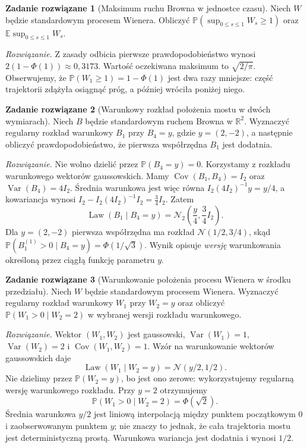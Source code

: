 \documentclass[11pt,a4paper,oneside]{report}
\numberwithin{equation}{chapter}
\theoremstyle{plain}
\theoremstyle{definition}
\newtheorem{zadanie}{Zadanie rozwiązane}[chapter]
\theoremstyle{remark}
\newcommand{\R}{\mathbb{R}}
\newcommand{\Prob}{\mathbb{P}}
\newcommand{\E}{\mathbb{E}}
\newcommand{\Var}{\operatorname{Var}}
\newcommand{\Cov}{\operatorname{Cov}}
\newcommand{\Law}{\operatorname{Law}}
\newcommand{\Normal}{\mathcal{N}}
\begin{document}
\begin{zadanie}[Maksimum ruchu Browna w jednostce czasu]
Niech $W$ będzie standardowym procesem Wienera.
Obliczyć $\Prob(\sup_{0\le s\le1}W_s\ge1)$ oraz
$\E\sup_{0\le s\le1}W_s$.

\emph{Rozwiązanie.} Z zasady odbicia pierwsze
prawdopodobieństwo wynosi $2(1-\Phi(1))\approx0{,}3173$.
Wartość oczekiwana maksimum to $\sqrt{2/\pi}$.
Obserwujemy, że $\Prob(W_1\ge1)=1-\Phi(1)$ jest dwa razy
mniejsze: część trajektorii zdążyła osiągnąć próg,
a później wróciła poniżej niego.
\end{zadanie}


\begin{zadanie}[Warunkowy rozkład położenia mostu w dwóch wymiarach]
Niech $B$ będzie standardowym ruchem Browna w $\R^2$.
Wyznaczyć regularny rozkład warunkowy $B_1$ przy $B_4=y$,
gdzie $y=(2,-2)$, a następnie obliczyć prawdopodobieństwo,
że pierwsza współrzędna $B_1$ jest dodatnia.

\emph{Rozwiązanie.} Nie wolno dzielić przez $\Prob(B_4=y)=0$.
Korzystamy z rozkładu warunkowego wektorów gaussowskich.
Mamy $\Cov(B_1,B_4)=I_2$ oraz $\Var(B_4)=4I_2$.
Średnia warunkowa jest więc równa $I_2(4I_2)^{-1}y=y/4$,
a kowariancja wynosi
$I_2-I_2(4I_2)^{-1}I_2=\tfrac34 I_2$.
Zatem
\[
\Law(B_1\mid B_4=y)=\Normal_2\!\left(\frac{y}{4},\frac34 I_2\right).
\]
Dla $y=(2,-2)$ pierwsza współrzędna ma rozkład
$\Normal(1/2,3/4)$, skąd
$\Prob(B_1^{(1)}>0\mid B_4=y)=\Phi(1/\sqrt3)$.
Wynik opisuje \emph{wersję} warunkowania określoną
przez ciągłą funkcję parametru $y$.
\end{zadanie}

\begin{zadanie}[Warunkowanie położenia procesu Wienera w środku przedziału]
Niech $W$ będzie standardowym procesem Wienera. Wyznaczyć
regularny rozkład warunkowy $W_1$ przy $W_2=y$ oraz
obliczyć $\Prob(W_1>0\mid W_2=2)$ w wybranej wersji
rozkładu warunkowego.

\emph{Rozwiązanie.} Wektor $(W_1,W_2)$ jest gaussowski,
$\Var(W_1)=1$, $\Var(W_2)=2$ i
$\Cov(W_1,W_2)=1$. Wzór na warunkowanie wektorów
gaussowskich daje
\[
\Law(W_1\mid W_2=y)=\Normal(y/2,1/2).
\]
Nie dzielimy przez $\Prob(W_2=y)$, bo jest ono zerowe:
wykorzystujemy regularną wersję warunkowego rozkładu.
Przy $y=2$ otrzymujemy
\[
\Prob(W_1>0\mid W_2=2)=\Phi(\sqrt 2).
\]
Średnia warunkowa $y/2$ jest liniową interpolacją
między punktem początkowym $0$ i zaobserwowanym punktem
$y$; nie znaczy to jednak, że cała trajektoria mostu
jest deterministyczną prostą. Warunkowa wariancja jest
dodatnia i wynosi $1/2$.
\end{zadanie}
\end{document}
